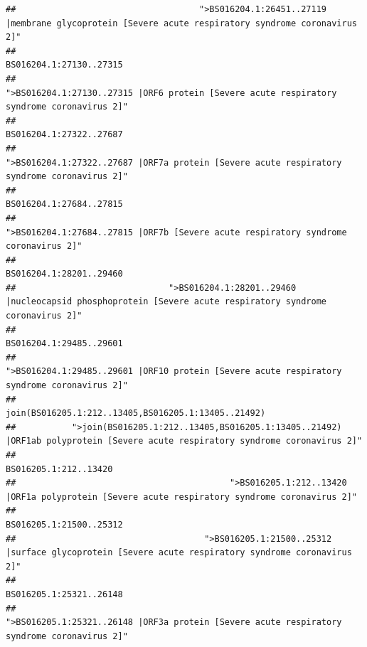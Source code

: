 \documentclass[
]{article}
\begin{document}
\begin{verbatim}
##                                    ">BS016204.1:26451..27119 |membrane glycoprotein [Severe acute respiratory syndrome coronavirus 2]" 
##                                                                                                                BS016204.1:27130..27315 
##                                             ">BS016204.1:27130..27315 |ORF6 protein [Severe acute respiratory syndrome coronavirus 2]" 
##                                                                                                                BS016204.1:27322..27687 
##                                            ">BS016204.1:27322..27687 |ORF7a protein [Severe acute respiratory syndrome coronavirus 2]" 
##                                                                                                                BS016204.1:27684..27815 
##                                                    ">BS016204.1:27684..27815 |ORF7b [Severe acute respiratory syndrome coronavirus 2]" 
##                                                                                                                BS016204.1:28201..29460 
##                              ">BS016204.1:28201..29460 |nucleocapsid phosphoprotein [Severe acute respiratory syndrome coronavirus 2]" 
##                                                                                                                BS016204.1:29485..29601 
##                                            ">BS016204.1:29485..29601 |ORF10 protein [Severe acute respiratory syndrome coronavirus 2]" 
##                                                                                    join(BS016205.1:212..13405,BS016205.1:13405..21492) 
##           ">join(BS016205.1:212..13405,BS016205.1:13405..21492) |ORF1ab polyprotein [Severe acute respiratory syndrome coronavirus 2]" 
##                                                                                                                  BS016205.1:212..13420 
##                                          ">BS016205.1:212..13420 |ORF1a polyprotein [Severe acute respiratory syndrome coronavirus 2]" 
##                                                                                                                BS016205.1:21500..25312 
##                                     ">BS016205.1:21500..25312 |surface glycoprotein [Severe acute respiratory syndrome coronavirus 2]" 
##                                                                                                                BS016205.1:25321..26148 
##                                            ">BS016205.1:25321..26148 |ORF3a protein [Severe acute respiratory syndrome coronavirus 2]" 

\end{verbatim}
\end{document}
